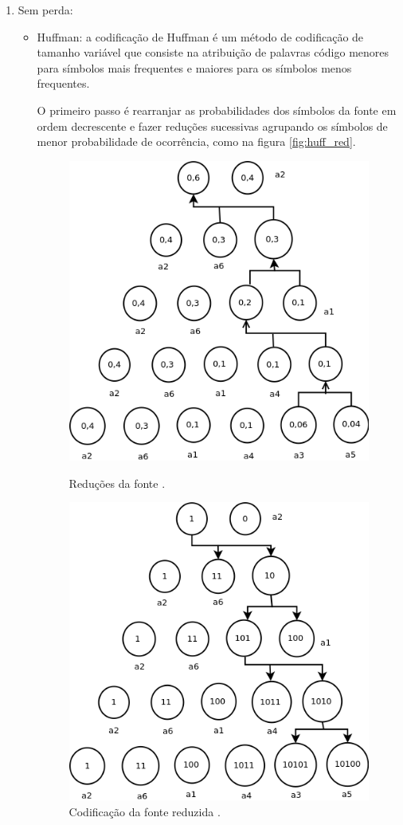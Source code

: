 \begin{enumerate}
\item Sem perda:
\begin{itemize}
\item Huffman: a codificação de Huffman \cite{huf52} é um método de codificação de tamanho variável que consiste na atribuição de palavras código menores para símbolos mais frequentes e maiores para os símbolos menos frequentes.

O primeiro passo é rearranjar as probabilidades dos símbolos da fonte em ordem decrescente e fazer reduções sucessivas agrupando os símbolos de menor probabilidade de ocorrência, como na figura \ref{fig:huff_red}.

\begin{figure}[!ht]

\begin{minipage}{\textwidth}
    \begin{minipage}{.4\textwidth}
      \centering
      \includegraphics[width=.79\textwidth]{./Figures/png/huff_red.png}
      \caption{Reduções da fonte \cite{Gonzalez2006}.}
      \label{fig:huff_red}
    \end{minipage}
    \begin{minipage}{.56\textwidth}
    \center
      \includegraphics[width=.56\textwidth]{./Figures/png/huff_cod.png}
      \caption{Codificação da fonte reduzida \cite{Gonzalez2006}.}
      \label{fig:huff_cod}
    \end{minipage}
  \end{minipage}
\end{figure}


\end{itemize}
\end{enumerate}

